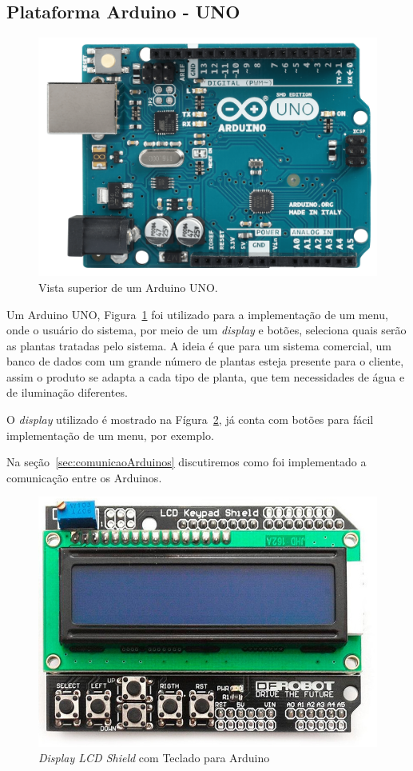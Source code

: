 \documentclass[a4paper,12pt]{report}
\begin{document}
		\subsection{Plataforma Arduino - UNO}
			
			\begin{figure}[!h]
				\centering
				\includegraphics[width=0.5\linewidth]{figs/ARDUINO_UNO_A06}
				\caption{Vista superior de um Arduino UNO.}
				\label{fig:UNO}
			\end{figure}
		
			Um Arduino UNO, Figura~\ref{fig:UNO} foi utilizado para a implementação de um menu, onde o usuário do sistema, por meio de um \textit{display} e botões, seleciona quais serão as plantas tratadas pelo sistema. A ideia é que para um sistema comercial, um banco de dados com um grande número de plantas esteja presente para o cliente, assim o produto se adapta a cada tipo de planta, que tem necessidades de água e de iluminação diferentes. 
			
			O \textit{display} utilizado é mostrado na Fígura~\ref{fig:keyboard}, já conta com botões para fácil implementação de um menu, por exemplo.
			
		    Na seção~\ref{sec:comunicaoArduinos} discutiremos como foi implementado a comunicação entre os Arduinos. 	
			\begin{figure}[!h]
				\centering
				\includegraphics[width=0.7\linewidth]{figs/lcd-keyboard}
				\caption{\textit{Display LCD Shield} com Teclado para Arduino}
				\label{fig:keyboard}
			\end{figure}
			
\end{document}
